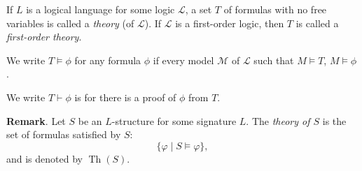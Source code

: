 \documentclass[12pt]{article}
\begin{document}
If $L$ is a logical language for some logic $\mathcal{L}$, a set $T$ of formulas with no free variables is called a \emph{theory} (of $\mathcal{L}$).  If $\mathcal{L}$ is a first-order logic, then $T$ is called a \emph{first-order theory}.

We write $T\vDash \phi$ for any formula $\phi$ if every model $\mathcal{M}$ of $\mathcal{L}$ such that $M\vDash T$, $M\vDash\phi$.

We write $T\vdash\phi$ is for there is a proof of $\phi$ from $T$.

\textbf{Remark}.  Let $S$ be an $L$-structure for some signature $L$. The \emph{theory of $S$} is the set of formulas satisfied by $S$: $$\lbrace \varphi \mid S\models \varphi \rbrace,$$ and is denoted by $\operatorname{Th}(S)$.
\end{document}

